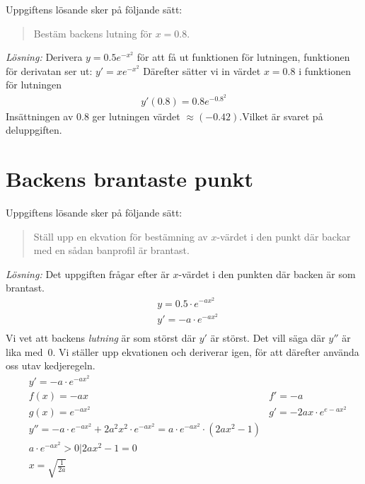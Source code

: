 \documentclass[a4paper,12pt]{article}
\begin{document}
Uppgiftens lösande sker på följande sätt:
%
\begin{quote} 
  Bestäm backens lutning för $x = 0.8$.
\end{quote}
%
\emph{Lösning:} Derivera $y=0.5e^{-x^2}$ för att få ut funktionen för lutningen,
funktionen för derivatan ser ut: $y'=xe^{-x^2}$
Därefter sätter vi in värdet $x=0.8$ i funktionen för lutningen
%
\begin{align*}
	y'(0.8)=0.8e^{-0.8^2}
\end{align*}
Insättningen av $0.8$ ger lutningen värdet $\approx(-0.42)$.Vilket är svaret på deluppgiften. 
%
%
%
%
\section{Backens brantaste punkt}
\label{sec:uppg2}


Uppgiftens lösande sker på följande sätt:
%
\begin{quote}
  Ställ upp en ekvation för bestämning av $x$-värdet i den punkt där backar med en sådan
  banprofil är brantast.
\end{quote}
%
\emph{Lösning:} Det uppgiften frågar efter är $x$-värdet i den punkten där backen är
 som brantast.
%
\begin{align*}
  &y=0.5\cdot e^{-ax^2}\\
  &y'=-a\cdot e^{-ax^2}\\
\end{align*}
%
 Vi vet att backens \emph{lutning} är som störst där $y'$ är störst. Det vill säga 
där $y''$ är lika med~0. Vi ställer upp ekvationen och deriverar igen, för att
därefter använda oss utav kedjeregeln.
%
\begin{align*}
  &y'=-a\cdot e^{-ax^2}\\
  &f(x)=-ax & f'=-a\\
  &g(x)=e^{-ax^2} & g'=-2ax\cdot e^{e-ax^2}\\
  &y''=-a\cdot e^{-ax^2}+2a^2x^2\cdot e^{-ax^2}=a\cdot e^{-ax^2}\cdot \left(2ax^2-1\right)\\
  &a\cdot e^{-ax^2}>0 | 2ax^2-1 = 0\\
  &x=\sqrt{\frac{1}{2a}}   
\end{align*}
\end{document}
